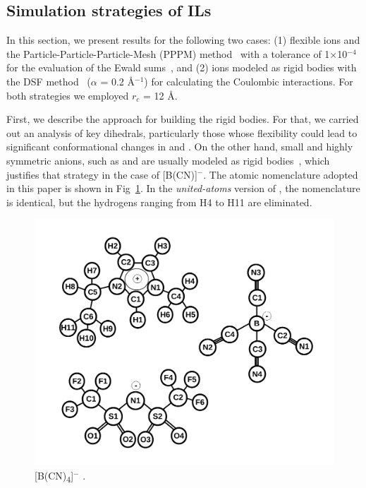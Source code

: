 \documentclass[3p,twocolumn]{elsarticle}
\begin{document}
\subsection{Simulation strategies of ILs}
\label{sec:prel_results}

In this section, we present results for the following two cases: (1) flexible ions and the Particle-Particle-Particle-Mesh (PPPM) method~\cite{Hockney_1988} with a tolerance of 1$\times$10$^{-4}$ for the evaluation of the Ewald sums~\cite{Ewald_1921}, and (2) ions modeled as rigid bodies with the DSF method~\cite{Fennell2006} ($\alpha$ = 0.2 {\AA}$^{-1}$) for calculating the Coulombic interactions. For both strategies we employed $r_c$ = 12 {\AA}.

First, we describe the approach for building the rigid bodies. For that, we carried out an analysis of key dihedrals, particularly those whose flexibility could lead to significant conformational changes in \ce{[emim]^+} and \ce{[Tf_2N]^-}. On the other hand, small and highly symmetric anions, such as  and  are usually modeled as rigid bodies~\cite{HANKE_2001,Hanke_2003,Lynden_Bell_2006}, which justifies that strategy in the case of [B(CN)]$^{-}$. The atomic nomenclature adopted in this paper is shown in Fig~\ref{fig:atoms_id}. In the \textit{united-atoms} version of \ce{[emim]^+}, the nomenclature is identical, but the hydrogens ranging from H4 to H11 are eliminated.

\begin{figure}[H]
\centering
\includegraphics[width=\linewidth]{ions_paper.pdf}
\caption{\ce{[emim]^+} [B(CN)\textsubscript{4}]$^{-}$ \ce{[NTf_2]^-}.}
\label{fig:atoms_id}
\end{figure}
\end{document}
